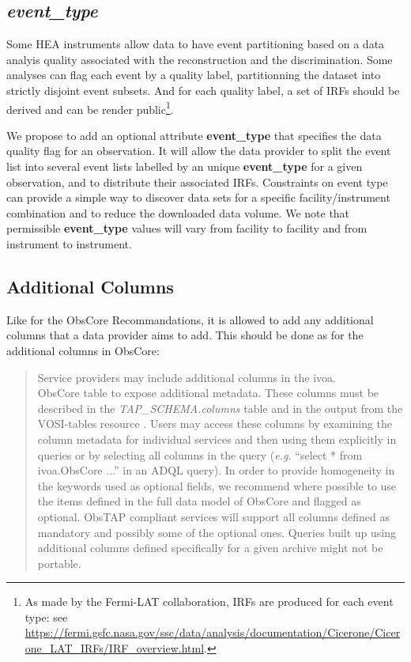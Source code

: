 \documentclass[11pt,a4paper]{ivoa}
\begin{document}
\subsection{{\em event\_type}}

Some \gls{HEA} instruments allow data to have event partitioning based on a data analyis quality associated with the reconstruction and the discrimination. Some analyses can flag each event by a quality label, partitionning the dataset into strictly disjoint event subsets. And for each quality label, a set of \glspl{IRF} should be derived and can be render public\footnote{As made by the Fermi-LAT collaboration, \glspl{IRF} are produced for each event type: see \url{https://fermi.gsfc.nasa.gov/ssc/data/analysis/documentation/Cicerone/Cicerone_LAT_IRFs/IRF_overview.html}.}.

We propose to add an optional attribute {\bf event\_type} that specifies the data quality flag for an observation. It will allow the data provider to split the event list into several event lists labelled by an unique {\bf event\_type} for a given observation, and to distribute their associated \glspl{IRF}. Constraints on event type can provide a simple way to discover data sets for a specific facility/instrument combination and to reduce the downloaded data volume. We note that permissible {\bf event\_type} values will vary from facility to facility and from instrument to instrument.

\subsection{Additional Columns}

Like for the ObsCore Recommandations, it is allowed to add any additional columns that a data provider aims to add. This should be done as for the additional columns in ObsCore:

\begin{quote}
Service providers may include additional columns in the ivoa.\\ObsCore table to expose additional metadata. These columns must be described in the {\it TAP\_SCHEMA.columns} table and in the output from the VOSI-tables resource \citep{2017ivoa.spec.0524G}. Users may access these columns by examining the column metadata for individual services and then using them explicitly in queries or by selecting all columns in the query ({\em e.g.\/} ``select * from ivoa.ObsCore ...'' in an ADQL query). In order to provide homogeneity in the keywords used as optional fields, we recommend where possible to use the items defined in the full data model of ObsCore and flagged as optional. ObsTAP compliant services will support all columns defined as mandatory and possibly some of the optional ones. Queries built up using additional columns defined specifically for a given archive might not be portable.
\end{quote}
\end{document}
